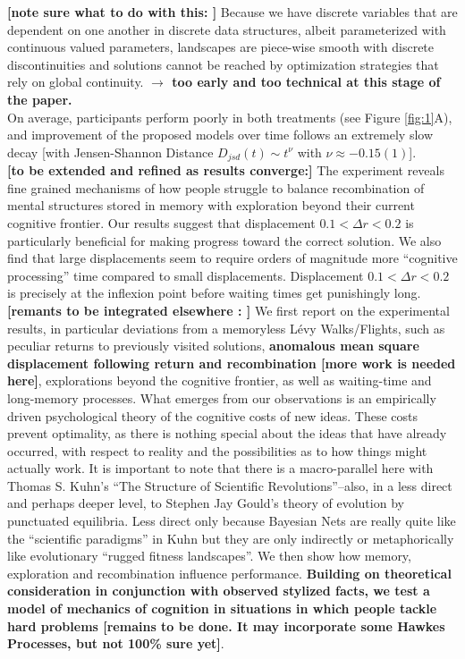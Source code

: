 {\bf [note sure what to do with this: ]} Because we have discrete variables that are dependent on one another in discrete data structures, albeit parameterized with continuous valued parameters, landscapes are piece-wise smooth with discrete discontinuities and solutions cannot be reached by optimization strategies that rely on global continuity. {\bf $\rightarrow$ too early and too technical at this stage of the paper.} \\

On average, participants perform poorly in both treatments (see Figure \ref{fig:1}A), and improvement of the proposed models over time follows an extremely slow decay [with Jensen-Shannon Distance $D_{jsd}(t) \sim t^{\nu}$ with $ \nu \approx -0.15(1)$]. \\

{\bf [to be extended and refined as results converge:]} The experiment reveals fine grained mechanisms of how people struggle to balance recombination of mental structures stored in memory with exploration beyond their current cognitive frontier.  Our results suggest that displacement $0.1 < \Delta r < 0.2 $ is particularly beneficial for making progress toward the correct solution. We also find that large displacements seem to require orders of magnitude more ``cognitive processing'' time compared to small displacements. Displacement $0.1 < \Delta r < 0.2 $ is precisely at the inflexion point before waiting times get punishingly long.\\

{\bf [remants to be integrated elsewhere : ]} We first report on the experimental results, in particular deviations from a memoryless L\'evy Walks/Flights, such as peculiar returns to previously visited solutions, {\bf anomalous mean square displacement following return and recombination [more work is needed here]}, explorations beyond the cognitive frontier, as well as waiting-time and long-memory processes. What emerges from our observations is an empirically driven psychological theory of the cognitive costs of new ideas. These costs prevent optimality, as there is nothing special about the ideas that have already occurred, with respect to reality and the possibilities as to how things might actually work. It is important to note that there is a macro-parallel here with Thomas S. Kuhn's ``The Structure of Scientific Revolutions''--also, in a less direct and perhaps deeper level, to Stephen Jay Gould's theory of evolution by punctuated equilibria. Less direct only because Bayesian Nets are really quite like the ``scientific paradigms'' in Kuhn but they are only indirectly or metaphorically like evolutionary ``rugged fitness landscapes''. We then show how memory, exploration and recombination influence performance. {\bf Building on theoretical consideration in conjunction with observed stylized facts, we test a model of mechanics of cognition in situations in which people tackle hard problems [remains to be done. It may incorporate some Hawkes Processes, but not 100\% sure yet]}. 

